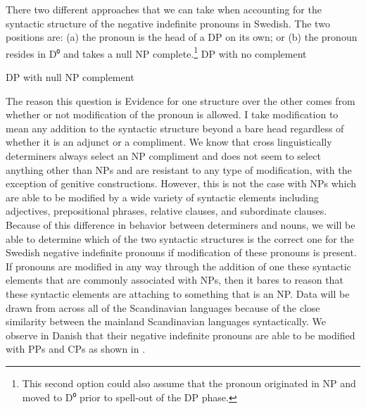 \documentclass[12pt, letterpaper]{article}
\begin{document}
\ea There two different approaches that we can take when accounting for the syntactic structure of the negative indefinite pronouns in Swedish. The two positions are: (a) the pronoun is the head of a DP on its own; or (b) the pronoun resides in D⁰ and takes a null NP complete.\footnote{This second option could also assume that the pronoun originated in NP and moved to D⁰ prior to spell-out of the DP phase.}
	\ea DP with no complement\\
	\ex DP with null NP complement\label{ex:DN} \\
	\z
\ex The reason this question is 
\ex Evidence for one structure over the other comes from whether or not modification of the pronoun is allowed. 
	\ea I take modification to mean any addition to the syntactic structure beyond a bare head regardless of whether it is an adjunct or a compliment. 
	\z 
\ex We know that cross linguistically determiners always select an NP compliment and does not seem to select anything other than NPs and are resistant to any type of modification, with the exception of genitive constructions. 
\ex However, this is not the case with NPs which are able to be modified by a wide variety of syntactic elements including adjectives, prepositional phrases, relative clauses, and subordinate clauses. 
\ex Because of this difference in behavior between determiners and nouns, we will be able to determine which of the two syntactic structures is the correct one for the Swedish negative indefinite pronouns if modification of these pronouns is present.
\ex If pronouns are modified in any way through the addition of one these syntactic elements that are commonly associated with NPs, then it bares to reason that these syntactic elements are attaching to something that is an NP.
\ex Data will be drawn from across all of the Scandinavian languages because of the close similarity between the mainland Scandinavian languages syntactically.
\ex We observe in Danish that their negative indefinite pronouns are able to be modified with PPs and CPs as shown in \citet[218ff]{allanDanishComprehensiveGrammar1995}.
\end{document}
